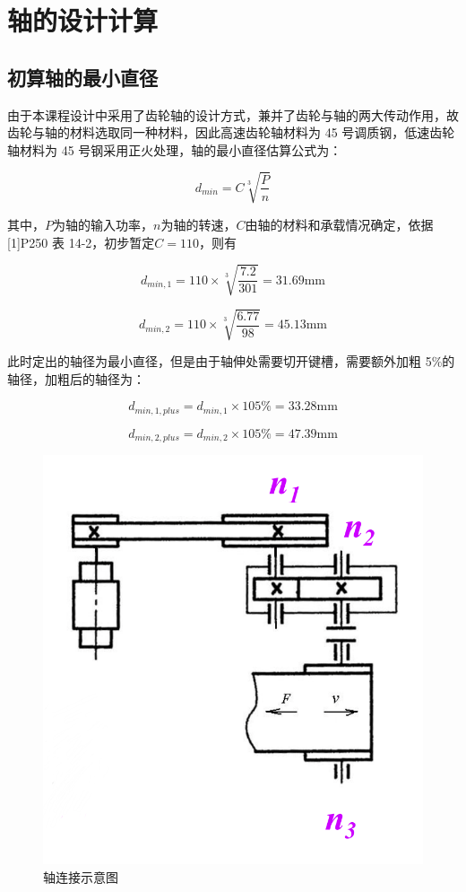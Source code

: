 \documentclass[12pt]{ctexart}
\begin{document}
\newpage

\section{轴的设计计算}

\subsection{初算轴的最小直径}

由于本课程设计中采用了齿轮轴的设计方式，兼并了齿轮与轴的两大传动作用，故齿轮与轴的材料选取同一种材料，因此高速齿轮轴材料为 45 号调质钢，低速齿轮轴材料为 45 号钢采用正火处理，轴的最小直径估算公式为：

$$d_{min}=C\sqrt[3]{\frac{P}{n}}$$

其中，$P$为轴的输入功率，$n$为轴的转速，$C$由轴的材料和承载情况确定，依据 [1]P250 表 14-2，初步暂定$C=110$，则有

$$d_{min,1}=110\times \sqrt[3]{\frac{7.2}{301}} = 31.69\text{mm}$$

$$d_{min,2}=110\times \sqrt[3]{\frac{6.77}{98}} = 45.13\text{mm}$$

此时定出的轴径为最小直径，但是由于轴伸处需要切开键槽，需要额外加粗 5\%的轴径，加粗后的轴径为：

$$d_{min,1,plus} = d_{min,1}\times 105\% = 33.28\text{mm}$$

$$d_{min,2,plus} = d_{min,2}\times 105\% = 47.39\text{mm}$$

\begin{figure}[htbp]
    \centering
    \includegraphics[scale=0.2]{dynamic_argument.png}
    \caption{轴连接示意图}\label{figure7}
\end{figure}
\end{document}
